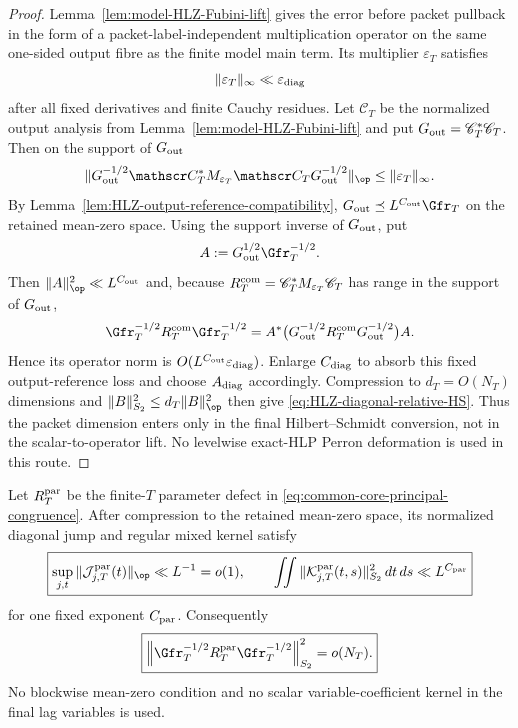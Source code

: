 \begin{proof}
Lemma~\ref{lem:model-HLZ-Fubini-lift} gives the error before packet pullback in
the form of a packet-label-independent multiplication operator on the same
one-sided output fibre as the finite model main term.  Its multiplier
$\varepsilon_T$ satisfies
\[
\|\varepsilon_T\|_{\infty}
\ll\varepsilon_{\rm diag}
\]
after all fixed derivatives and finite Cauchy residues.  Let
$\mathscr C_T$ be the normalized output analysis from
Lemma~\ref{lem:model-HLZ-Fubini-lift} and put
$G_{\rm out}=\mathscr C_T^*\mathscr C_T$.  Then on the support of
$G_{\rm out}$
\[
\|G_{\rm out}^{-1/2}\mathscr C_T^*M_{\varepsilon_T}\mathscr C_T
G_{\rm out}^{-1/2}\|_{\op}
\le\|\varepsilon_T\|_\infty.
\]
By Lemma~\ref{lem:HLZ-output-reference-compatibility},
$G_{\rm out}\preceq L^{C_{\rm out}}\Gfr_T$ on the retained mean-zero space.
Using the support inverse of $G_{\rm out}$, put
\[
A:=G_{\rm out}^{1/2}\Gfr_T^{-1/2}.
\]
Then $\|A\|_{\op}^2\ll L^{C_{\rm out}}$ and, because
$R_T^{\rm com}=\mathscr C_T^*M_{\varepsilon_T}\mathscr C_T$ has range in the
support of $G_{\rm out}$,
\[
\Gfr_T^{-1/2}R_T^{\rm com}\Gfr_T^{-1/2}
=A^*\bigl(G_{\rm out}^{-1/2}R_T^{\rm com}G_{\rm out}^{-1/2}\bigr)A.
\]
Hence its operator norm is
$O(L^{C_{\rm out}}\varepsilon_{\rm diag})$.  Enlarge
$C_{\rm diag}$ to absorb this fixed output-reference loss and choose
$A_{\rm diag}$ accordingly. Compression to $d_T=O(N_T)$ dimensions and
$\|B\|_{S_2}^2\le d_T\|B\|_{\op}^2$ then give
\eqref{eq:HLZ-diagonal-relative-HS}.  Thus the packet dimension enters only in
the final Hilbert--Schmidt conversion, not in the scalar-to-operator lift.  No
levelwise exact-HLP Perron deformation is used in this route.
\end{proof}

\begin{lemma}
\label{lem:finiteT-parameter-regular}
Let $R_T^{\rm par}$ be the finite-$T$ parameter defect in
\eqref{eq:common-core-principal-congruence}.  After compression to the retained
mean-zero space, its normalized diagonal jump and regular mixed kernel satisfy
\begin{equation}
\boxed{
\sup_{j,t}\|\mathcal J^{\rm par}_{j,T}(t)\|_{\op}\ll L^{-1}=o(1),
\qquad
\iint\|\mathcal K^{\rm par}_{j,T}(t,s)\|_{S_2}^2\,dt\,ds
\ll L^{C_{\rm par}}
}
\label{eq:finiteT-parameter-shell-bounds}
\end{equation}
for one fixed exponent $C_{\rm par}$.  Consequently
\begin{equation}
\boxed{
\left\|\Gfr_T^{-1/2}R_T^{\rm par}\Gfr_T^{-1/2}\right\|_{S_2}^2
=o(N_T).
}
\label{eq:finiteT-parameter-relative-HS}
\end{equation}
No blockwise mean-zero condition and no scalar variable-coefficient kernel in
the final lag variables is used.
\end{lemma}

